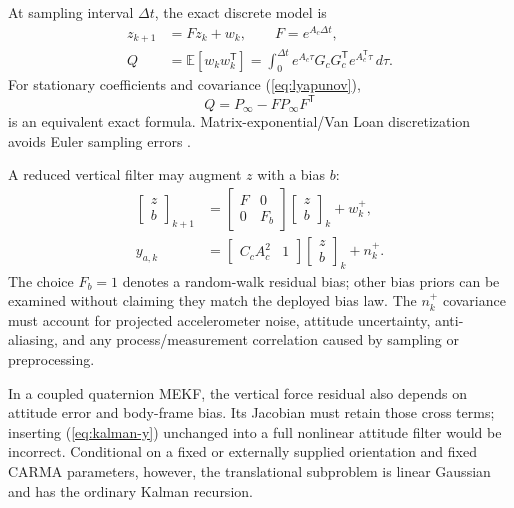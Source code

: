 \documentclass[10pt,journal]{IEEEtran}
\newcommand{\E}{\mathbb E}
\newcommand{\T}{^{\mathsf T}}
\begin{document}
At sampling interval \(\Delta t\), the exact discrete
model is
\begin{align}
z_{k+1}&=Fz_k+w_k,\qquad F=e^{A_c\Delta t},\nonumber\\
Q&=\E[w_kw_k\T]
 =\int_0^{\Delta t}e^{A_c\tau}G_cG_c\T
                  e^{A_c\T\tau}\,d\tau.
\label{eq:exact-discrete}
\end{align}
For stationary coefficients and covariance (\ref{eq:lyapunov}),
\begin{equation}
Q=P_\infty-FP_\infty F\T
\label{eq:stationary-Q}
\end{equation}
is an equivalent exact formula. Matrix-exponential/Van Loan
discretization avoids Euler sampling errors
\cite{sarkka23}.

A reduced vertical filter may augment \(z\) with a bias \(b\):
\begin{align}
\begin{bmatrix}z\\b\end{bmatrix}_{k+1}
&=\begin{bmatrix}F&0\\0&F_b\end{bmatrix}
  \begin{bmatrix}z\\b\end{bmatrix}_k+w_k^+,\nonumber\\
y_{a,k}&=\begin{bmatrix}C_cA_c^2&1\end{bmatrix}
\begin{bmatrix}z\\b\end{bmatrix}_k+n_k^+ .
\label{eq:kalman-y}
\end{align}
The choice \(F_b=1\) denotes a random-walk residual bias;
other bias priors can be examined without claiming they match
the deployed bias law. The \(n_k^+\) covariance must account
for projected accelerometer noise, attitude uncertainty,
anti-aliasing, and any process/measurement correlation caused
by sampling or preprocessing.

In a coupled quaternion MEKF, the vertical force residual
also depends on attitude error and body-frame bias.
Its Jacobian must retain those cross terms; inserting
(\ref{eq:kalman-y}) unchanged into a full nonlinear
attitude filter would be incorrect. Conditional on a fixed
or externally supplied orientation and fixed CARMA
parameters, however, the translational subproblem is linear
Gaussian and has the ordinary Kalman recursion.
\end{document}
